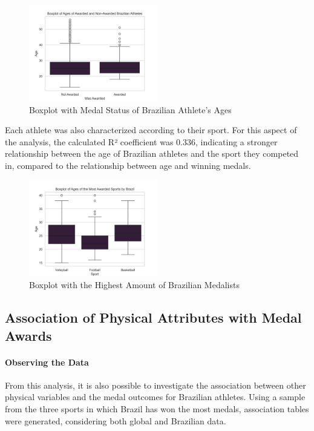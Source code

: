 \documentclass{article}
\begin{document}
\begin{figure}[H]
\centering
\includegraphics[width=0.5\textwidth]{images/age_analysis/boxplot_age_awarded_and_non_awarded_brazil.png}
\caption{\label{fig3}Boxplot with Medal Status of Brazilian Athlete's Ages}
\end{figure}

Each athlete was also characterized according to their sport. For this aspect of the analysis, the calculated R² coefficient was 0.336, indicating a stronger relationship between the age of Brazilian athletes and the sport they competed in, compared to the relationship between age and winning medals.

\begin{figure}[H]
\centering
\includegraphics[width=0.5\textwidth]{images/age_analysis/boxplot_top_3_most_awarded.png}
\caption{\label{fig3}Boxplot with the Highest Amount of Brazilian Medalists}
\end{figure}

\subsection{Association of Physical Attributes with Medal Awards}
\paragraph{Observing the Data}
From this analysis, it is also possible to investigate the association between other physical variables and the medal outcomes for Brazilian athletes. Using a sample from the three sports in which Brazil has won the most medals, association tables were generated, considering both global and Brazilian data.
\end{document}
